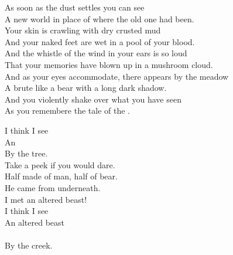 
\label{album:murder-of-the-universe}





As soon as the dust settles you can see \\
A new world in place of where the old one had been. \\

Your skin is crawling with dry crusted mud \\
And your naked feet are wet in a pool of your blood. \\

And the whistle of the wind in your ears is so loud \\
That your memories have blown up in a mushroom cloud. \\

And as your eyes accommodate, there appears by the meadow \\
A brute like a bear with a long dark shadow. \\

And you violently shake over what you have seen \\
As you remembere the tale of the  . \\





I think I see \\
An   \\
By the tree. \\

Take a peek if you would dare. \\
Half made of man, half of bear. \\

He came from underneath. \\
I met an altered beast! \\

I think I see \\
An altered beast \\ \\
By the creek. \\

